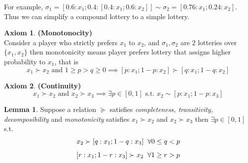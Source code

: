\documentclass{article}
\theoremstyle{definition}
\newtheorem{lem}{Lemma}[section]
\newtheorem{ax}{Axiom}[section]
\begin{document}
For example, $\sigma_1 = [0.6:x_1; 0.4:[0.4:x_1; 0.6:x_2]] \sim \sigma_2 = [0.76:x_1;0.24:x_2]$. Thus we can simplify a compound lottery to a simple lottery.
\begin{ax}
\textbf{(Monotonocity)}\\

Consider a player who strictly prefers $x_1$ to $x_2$, and $\sigma_1, \sigma_2$ are 2 lotteries over $\{x_1,x_2\}$ then monotonicity means player prefers lottery that assigns higher probability to $x_1$, that is
$$x_1\succ x_2 \text{ and } 1\geq p>q\geq 0 \implies [p:x_1;1-p:x_2] \succ [q:x_1;1-q:x_2]$$
\end{ax} 
\begin{ax}
\textbf{(Continuity)}\\
$$x_1\succ  x_2 \text{ and } x_2\succ x_3 \implies \exists p\in[0,1] \text{ s.t. } x_2 \sim [p:x_1;1-p:x_3]$$ 
\end{ax}
\begin{lem}
Suppose a relation $\succeq$ satisfies \textit{completeness, transitivity, decomposibility} and \textit{monotonicity} satisfies $x_1\succ x_2$ and $x_2 \succ x_3$ then $\exists p\in [0,1]$ s.t. $$x_2\succ [q:x_1;1-q:x_3]\hspace{2mm} \forall 0\leq q<p$$ $$[r:x_1;1-r:x_3]\succ x_2  \hspace{2mm}\forall 1\geq r>p$$
\end{lem}
\end{document}
